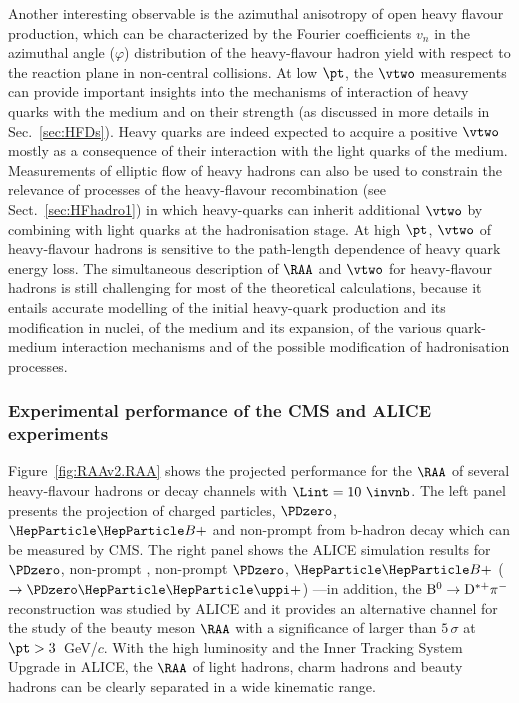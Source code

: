 Another interesting observable is the azimuthal anisotropy of open heavy flavour production, which can be characterized by the Fourier coefficients $v_n$ in the azimuthal angle ($\varphi$) distribution of the heavy-flavour hadron yield with respect to the reaction plane in non-central \PbPb collisions. 
At low $\pt$, the $\vtwo$ measurements can provide important insights into the mechanisms of interaction of heavy quarks with the medium and on their strength (as discussed in more details in Sec.~\ref{sec:HFDs}). Heavy quarks are indeed expected to acquire a positive $\vtwo$ mostly as a consequence of their interaction with the light quarks of the medium.
Measurements of elliptic flow of heavy hadrons can also be used to constrain the relevance of processes of the heavy-flavour recombination (see Sect.~\ref{sec:HFhadro1}) in which heavy-quarks can inherit additional $\vtwo$ by combining with light quarks at the hadronisation stage. 
At high $\pt$, $\vtwo$ of heavy-flavour hadrons is sensitive to the path-length dependence of heavy quark energy loss. The simultaneous description of $\RAA$ and $\vtwo$ for heavy-flavour hadrons is still challenging for most of the theoretical calculations, because it entails accurate modelling of the initial heavy-quark production and its modification in nuclei, of the medium and its expansion, of the various quark-medium interaction mechanisms and of the possible modification of hadronisation processes.


\subsubsection{Experimental performance of the CMS and ALICE experiments}
\label{sec:HFRAAv2}

Figure~\ref{fig:RAAv2.RAA} shows the projected performance for the $\RAA$ of several heavy-flavour hadrons or decay channels with $\Lint=10~\invnb$. The left panel presents the projection of charged particles, $\PDzero$, $\PBp$ and non-prompt \PJGy from b-hadron decay which can be measured by CMS. The right panel shows the ALICE simulation results for $\PDzero$, non-prompt \PJGy, non-prompt $\PDzero$, $\PBp$ ($\rightarrow \PDzero \PGpp$) 
---in addition, the $\rm B^0\rightarrow D^{*+}\pi^-$ reconstruction was studied by ALICE and it provides an alternative channel for the study of the beauty meson $\RAA$ with a significance of larger than $5\,\sigma$ at $\pt > 3$~GeV/$c$. With the high luminosity and the Inner Tracking System Upgrade in ALICE, the $\RAA$ of light hadrons, charm hadrons and beauty hadrons can be clearly separated in a wide kinematic range.

